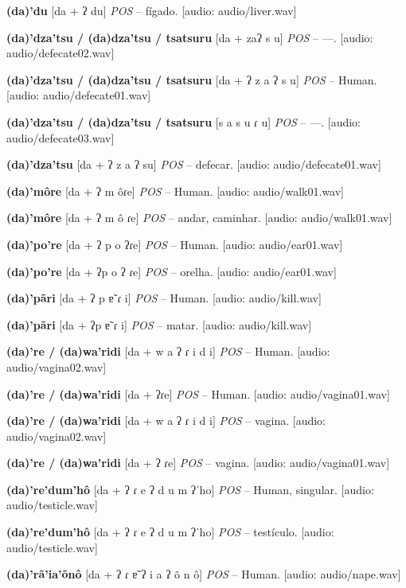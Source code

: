 \textbf{(da)'du} [da + ʔ du] \textit{POS} -- fígado. [audio: audio/liver.wav]{\faHeadphones}

\textbf{(da)'dza'tsu / (da)dza'tsu / tsatsuru} [da + zaʔ s u] \textit{POS} -- —. [audio: audio/defecate02.wav]{\faHeadphones}

\textbf{(da)'dza'tsu / (da)dza'tsu / tsatsuru} [da + ʔ z a ʔ s u] \textit{POS} -- Human. [audio: audio/defecate01.wav]{\faHeadphones}

\textbf{(da)'dza'tsu / (da)dza'tsu / tsatsuru} [s a s u ɾ u] \textit{POS} -- —. [audio: audio/defecate03.wav]{\faHeadphones}

\textbf{(da)'dza'tsu} [da + ʔ z a ʔ su] \textit{POS} -- defecar. [audio: audio/defecate01.wav]{\faHeadphones}

\textbf{(da)'môre} [da + ʔ m ôɾe] \textit{POS} -- Human. [audio: audio/walk01.wav]{\faHeadphones}

\textbf{(da)'môre} [da + ʔ m ô ɾe] \textit{POS} -- andar, caminhar. [audio: audio/walk01.wav]{\faHeadphones}

\textbf{(da)'po're} [da + ʔ p o ʔɾe] \textit{POS} -- Human. [audio: audio/ear01.wav]{\faHeadphones}

\textbf{(da)'po're} [da + ʔp o ʔ ɾe] \textit{POS} -- orelha. [audio: audio/ear01.wav]{\faHeadphones}

\textbf{(da)'pãri} [da + ʔ p ɐ̃ ɾ i] \textit{POS} -- Human. [audio: audio/kill.wav]{\faHeadphones}

\textbf{(da)'pãri} [da + ʔp ɐ̃ ɾ i] \textit{POS} -- matar. [audio: audio/kill.wav]{\faHeadphones}

\textbf{(da)'re / (da)wa'ridi} [da + w a ʔ ɾ i d i] \textit{POS} -- Human. [audio: audio/vagina02.wav]{\faHeadphones}

\textbf{(da)'re / (da)wa'ridi} [da + ʔɾe] \textit{POS} -- Human. [audio: audio/vagina01.wav]{\faHeadphones}

\textbf{(da)'re / (da)wa'ridi} [da + w a ʔ ɾ i d i] \textit{POS} -- vagina. [audio: audio/vagina02.wav]{\faHeadphones}

\textbf{(da)'re / (da)wa'ridi} [da + ʔ ɾe] \textit{POS} -- vagina. [audio: audio/vagina01.wav]{\faHeadphones}

\textbf{(da)'re'dum'hô} [da + ʔ ɾ e ʔ d u m ʔˈho] \textit{POS} -- Human, singular. [audio: audio/testicle.wav]{\faHeadphones}

\textbf{(da)'re'dum'hô} [da + ʔ ɾ e ʔ d u m ʔˈho] \textit{POS} -- testículo. [audio: audio/testicle.wav]{\faHeadphones}

\textbf{(da)'rã'ia'õnô} [da + ʔ ɾ ɐ̃ ʔ i a ʔ õ n ô] \textit{POS} -- Human. [audio: audio/nape.wav]{\faHeadphones}

